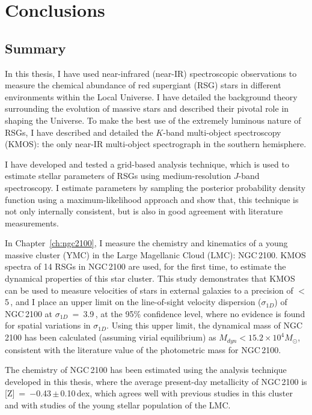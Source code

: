 \chapter{Conclusions}
\label{ch:conclusions}
\renewcommand{\headrulewidth}{1pt}

\section{Summary} %
\label{sec:exec-sum}
In this thesis, I have used near-infrared (near-IR) spectroscopic observations to measure the chemical abundance of red supergiant (RSG) stars in different environments within the Local Universe.
I have detailed the background theory surrounding the evolution of massive stars and described their pivotal role in shaping the Universe.
To make the best use of the extremely luminous nature of RSGs, I have described and detailed the $K$-band multi-object spectroscopy (KMOS): the only near-IR multi-object spectrograph in the southern hemisphere.

I have developed and tested a grid-based analysis technique, which is used to estimate stellar parameters of RSGs using medium-resolution $J$-band spectroscopy.
I estimate parameters by sampling the posterior probability density function using a maximum-likelihood approach and show that, this technique is not only internally consistent, but is also in good agreement with literature measurements.

In Chapter~\ref{ch:ngc2100}, I measure the chemistry and kinematics of a young massive cluster (YMC) in the Large Magellanic Cloud (LMC): NGC\,2100.
KMOS spectra of 14 RSGs in NGC\,2100 are used, for the first time, to estimate the dynamical properties of this star cluster.
This study demonstrates that KMOS can be used to measure velocities of stars in external galaxies to a precision of $<$5\,\kms, and I place an upper limit on the line-of-sight velocity dispersion ($\sigma_{1D}$) of NGC\,2100 at $\sigma_{1D}$~=~3.9\,\kms, at the 95\% confidence level, where no evidence is found for spatial variations in $\sigma_{1D}$.
Using this upper limit, the dynamical mass of NGC\,2100 has been calculated (assuming virial equilibrium) as $M_{dyn} < 15.2 \times 10^{4}M_{\odot}$, consistent with the literature value of the photometric mass for NGC\,2100.

The chemistry of NGC\,2100 has been estimated using the analysis technique developed in this thesis, where the average present-day metallicity of NGC\,2100 is [Z]~=~$-$0.43\,$\pm$\,0.10\,dex, which agrees well with previous studies in this cluster and with studies of the young stellar population of the LMC.

